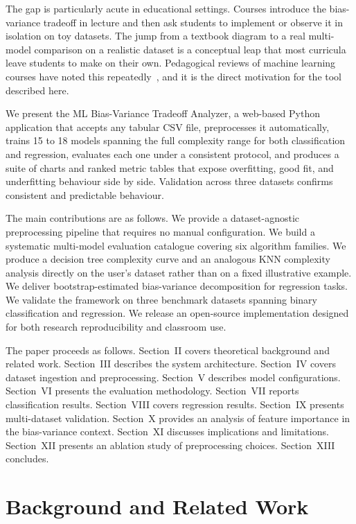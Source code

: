 \documentclass[conference]{IEEEtran}
\begin{document}
The gap is particularly acute in educational settings. Courses introduce the bias-variance tradeoff in lecture and then ask students to implement or observe it in isolation on toy datasets. The jump from a textbook diagram to a real multi-model comparison on a realistic dataset is a conceptual leap that most curricula leave students to make on their own. Pedagogical reviews of machine learning courses have noted this repeatedly~\cite{b32}, and it is the direct motivation for the tool described here.

We present the ML Bias-Variance Tradeoff Analyzer, a web-based Python application that accepts any tabular CSV file, preprocesses it automatically, trains 15 to 18 models spanning the full complexity range for both classification and regression, evaluates each one under a consistent protocol, and produces a suite of charts and ranked metric tables that expose overfitting, good fit, and underfitting behaviour side by side. Validation across three datasets confirms consistent and predictable behaviour.

The main contributions are as follows. We provide a dataset-agnostic preprocessing pipeline that requires no manual configuration. We build a systematic multi-model evaluation catalogue covering six algorithm families. We produce a decision tree complexity curve and an analogous KNN complexity analysis directly on the user's dataset rather than on a fixed illustrative example. We deliver bootstrap-estimated bias-variance decomposition for regression tasks. We validate the framework on three benchmark datasets spanning binary classification and regression. We release an open-source implementation designed for both research reproducibility and classroom use.

The paper proceeds as follows. Section~II covers theoretical background and related work. Section~III describes the system architecture. Section~IV covers dataset ingestion and preprocessing. Section~V describes model configurations. Section~VI presents the evaluation methodology. Section~VII reports classification results. Section~VIII covers regression results. Section~IX presents multi-dataset validation. Section~X provides an analysis of feature importance in the bias-variance context. Section~XI discusses implications and limitations. Section~XII presents an ablation study of preprocessing choices. Section~XIII concludes.

\section{Background and Related Work}
\end{document}
